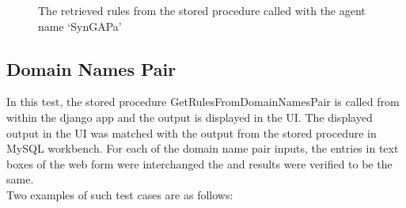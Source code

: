 \documentclass[msc,deptreport,ai]{infthesis}      %
\begin{document}
\begin{enumerate}
\begin{figure}[H]
		\caption{The retrieved rules from the stored procedure called with the agent name `SynGAPa'}
		\label{fig:CorrectnessAgentName2}		
	\end{figure}	
\end{enumerate}


\subsection{Domain Names Pair}
In this test, the stored procedure GetRulesFromDomainNamesPair is called from within the django app and the output is displayed in the UI. The displayed output in the UI was matched with the output from the stored procedure in MySQL workbench. For each of the domain name pair inputs, the entries in text boxes of the web form were interchanged the and results were verified to be the same.\\ Two examples of such test cases are as follows:
\end{document}
